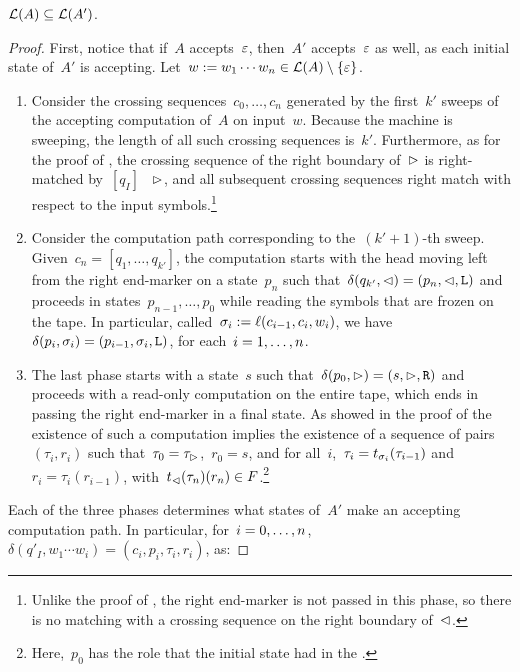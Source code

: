 \begin{lemm}\label{lem:swkLAtoNFA-1}
	$\mathcal L(A)\subseteq\mathcal L(A')$.
\end{lemm}
\begin{proof}
	First, notice that if~$A$ accepts~$\varepsilon$, then~$A'$ accepts~$\varepsilon$ as well, as each initial state of~$A'$ is accepting.
	Let~$w:=w_1\cdots w_n\in\mathcal L(A)\setminus\{\varepsilon\}$.
	\begin{enumerate}
		\item Consider the crossing sequences~$c_0,\dots,c_n$ generated by the first~$k'$ sweeps of the accepting computation of~$A$ on input~$w$.
		      Because the machine is sweeping, the length of all such crossing sequences is~$k'$.
		      Furthermore, as for the proof of , the crossing sequence of the right boundary of~$\rhd$ is right-matched by~$[q_I]$ \wrt~$\rhd$, and all subsequent crossing sequences right match with respect to the input symbols.\footnote{%
			      Unlike the proof of , the right end-marker is not passed in this phase, so there is no matching with a crossing sequence on the right boundary of~$\lhd$.}
		\item Consider the computation path corresponding to the~$(k'+1)$-th sweep.
		      Given~$c_n=[q_1,\dots,q_{k'}]$, the computation starts with the head moving left from the right end-marker on a state~$p_n$ such that~$\delta(q_{k'},\lhd)=(p_n,\lhd,\mathtt L)$ and proceeds in states~$p_{n-1},\dots,p_0$ while reading the symbols that are frozen on the tape.
		      In particular, called~$\sigma_i:=\ell(c_{i-1},c_i,w_i)$, we have~$\delta(p_i,\sigma_i)=(p_{i-1},\sigma_i,\mathtt L)$, for each~$i=1,\dots,n$.
		\item The last phase starts with a state~$s$ such that~$\delta(p_0,\rhd)=(s,\rhd,\mathtt R)$ and proceeds with a read-only computation on the entire tape, which ends in passing the right end-marker in a final state.
		      As showed in the proof of  the existence of such a computation implies the existence of a sequence of pairs~$(\tau_i,r_i)$ such that~$\tau_0=\tau_\rhd$,~$r_0=s$, and for all~$i$,~$\tau_i=t_{\sigma_i}(\tau_{i-1})$ and~$r_i=\tau_i(r_{i-1})$, with~$t_\lhd(\tau_n)(r_n)\in F$.\footnote{%
			      Here,~$p_0$ has the role that the initial state had in the \TDFA.}
	\end{enumerate}
	Each of the three phases determines what states of~$A'$ make an accepting computation path. In particular, for~$i=0,\dots,n$,~$\delta(q'_I,w_1\cdots w_i)=(c_i,p_i,\tau_i,r_i)$, as:

\end{proof}

